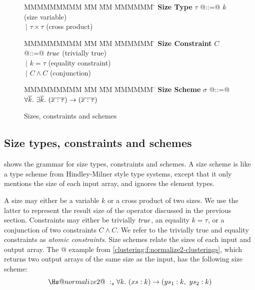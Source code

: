 \begin{figure}
\begin{tabbing}
MMMMMMMMM \= MM  \= MM \= MMMMMM \= \kill
\textbf{Size Type}
\> $\tau$   \> @::=@  \> $k$                  \> (size variable)       \\
\>          \> $~|$   \> $\tau \times \tau$   \> (cross product)
\end{tabbing}

\begin{tabbing}
MMMMMMMMM \= MM  \= MM \= MMMMMM \= \kill
\textbf{Size Constraint}
\> $C$      \> @::=@  \> $\mathit{true}$               \> (trivially true)      \\
\>          \> $~|$   \> $k = \tau$           \> (equality constraint) \\
\>          \> $~|$   \> $C \wedge C$         \> (conjunction)
\end{tabbing}

\begin{tabbing}
MMMMMMMMM \= MM  \= MM \= MMMMMM \= \kill
\textbf{Size Scheme}
\> $\sigma$ \> @::=@  
        \> $\forall \overline{k}.~ \exists \overline{k}.~ (\overline{ x : \tau }) \to (\overline{x : \tau})$
\end{tabbing}

\caption{Sizes, constraints and schemes}
\label{clustering:f:constraints}
\end{figure}


\newcommand{\constr}[1]{\llbracket #1 \rrbracket}


\subsection{Size types, constraints and schemes}
\label{clustering:s:SizeTypes}
 shows the grammar for size types, constraints and schemes.
A size scheme is like a type scheme from Hindley-Milner style type systems, except that it only mentions the size of each input array, and ignores the element types.

A size may either be a variable $k$ or a cross product of two sizes.
We use the latter to represent the result size of the \Hs@cross@ operator discussed in the previous section.
Constraints may either be trivially $\mathit{true}$, an equality $k = \tau$, or a conjunction of two constraints $C \wedge C$.
We refer to the trivially true and equality constraints as \emph{atomic constraints}.
Size schemes relate the sizes of each input and output array.
The @ example from \cref{clustering:f:normalize2-clusterings}, which returns two output arrays of the same size as the input, has the following size scheme:
$$
\Hs@normalize2@ ~:_s \forall k.~ (xs : k) \to (ys_1 : k,~ ys_2 : k)
$$

